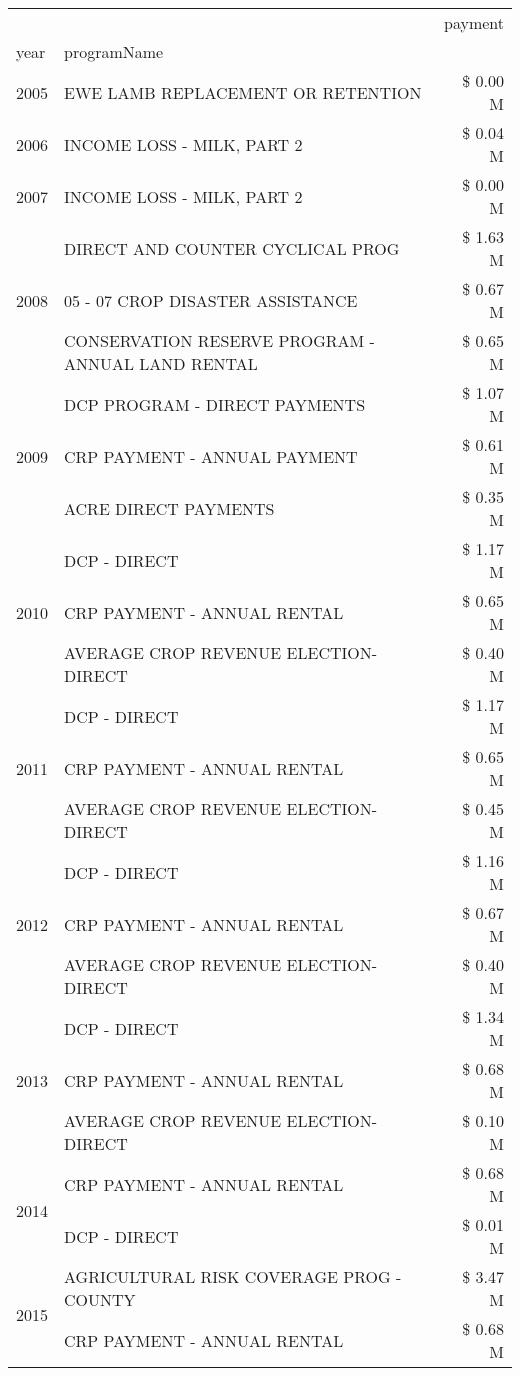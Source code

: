 \begin{tabular}{llr}
\toprule
 &  & payment \\
year & programName &  \\
\midrule
2005 & EWE LAMB REPLACEMENT OR RETENTION & \$ 0.00 M \\
\cline{1-3}
2006 & INCOME LOSS - MILK, PART 2 & \$ 0.04 M \\
\cline{1-3}
2007 & INCOME LOSS - MILK, PART 2 & \$ 0.00 M \\
\cline{1-3}
\multirow[t]{3}{*}{2008} & DIRECT AND COUNTER CYCLICAL PROG & \$ 1.63 M \\
 & 05 - 07 CROP DISASTER ASSISTANCE & \$ 0.67 M \\
 & CONSERVATION RESERVE PROGRAM - ANNUAL LAND RENTAL & \$ 0.65 M \\
\cline{1-3}
\multirow[t]{3}{*}{2009} & DCP PROGRAM - DIRECT PAYMENTS & \$ 1.07 M \\
 & CRP PAYMENT - ANNUAL PAYMENT & \$ 0.61 M \\
 & ACRE DIRECT PAYMENTS & \$ 0.35 M \\
\cline{1-3}
\multirow[t]{3}{*}{2010} & DCP - DIRECT & \$ 1.17 M \\
 & CRP PAYMENT - ANNUAL RENTAL & \$ 0.65 M \\
 & AVERAGE CROP REVENUE ELECTION-DIRECT & \$ 0.40 M \\
\cline{1-3}
\multirow[t]{3}{*}{2011} & DCP - DIRECT & \$ 1.17 M \\
 & CRP PAYMENT - ANNUAL RENTAL & \$ 0.65 M \\
 & AVERAGE CROP REVENUE ELECTION-DIRECT & \$ 0.45 M \\
\cline{1-3}
\multirow[t]{3}{*}{2012} & DCP - DIRECT & \$ 1.16 M \\
 & CRP PAYMENT - ANNUAL RENTAL & \$ 0.67 M \\
 & AVERAGE CROP REVENUE ELECTION-DIRECT & \$ 0.40 M \\
\cline{1-3}
\multirow[t]{3}{*}{2013} & DCP - DIRECT & \$ 1.34 M \\
 & CRP PAYMENT - ANNUAL RENTAL & \$ 0.68 M \\
 & AVERAGE CROP REVENUE ELECTION-DIRECT & \$ 0.10 M \\
\cline{1-3}
\multirow[t]{2}{*}{2014} & CRP PAYMENT - ANNUAL RENTAL & \$ 0.68 M \\
 & DCP - DIRECT & \$ 0.01 M \\
\cline{1-3}
\multirow[t]{2}{*}{2015} & AGRICULTURAL RISK COVERAGE PROG - COUNTY & \$ 3.47 M \\
 & CRP PAYMENT - ANNUAL RENTAL & \$ 0.68 M \\

\end{tabular}
